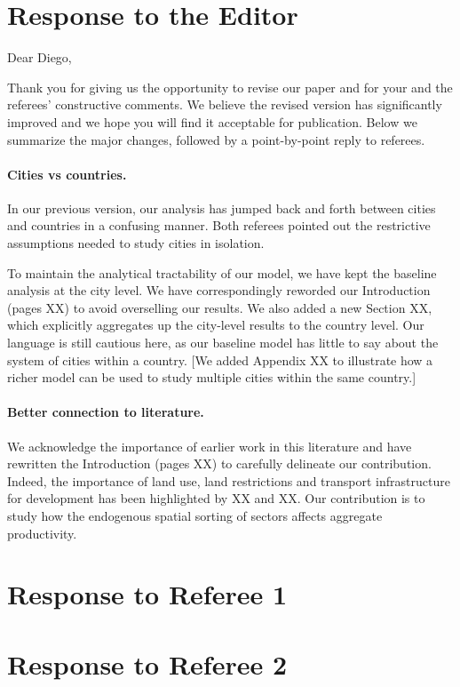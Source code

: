 \newpage
\section*{Response to the Editor}
Dear Diego,

Thank you for giving us the opportunity to revise our paper and for your and the referees' constructive comments. We believe the revised version has significantly improved and we hope you will find it acceptable for publication. Below we summarize the major changes, followed by a point-by-point reply to referees.

\paragraph{Cities vs countries.} In our previous version, our analysis has jumped back and forth between cities and countries in a confusing manner. Both referees pointed out the restrictive assumptions needed to study cities in isolation. 

To maintain the analytical tractability of our model, we have kept the baseline analysis at the city level. We have correspondingly reworded our Introduction (pages XX) to avoid overselling our results. We also added a new Section XX, which explicitly aggregates up the city-level results to the country level. Our language is still cautious here, as our baseline model has little to say about the system of cities within a country. [We added Appendix XX to illustrate how a richer model can be used to study multiple cities within the same country.]

\paragraph{Better connection to literature.} We acknowledge the importance of earlier work in this literature and have rewritten the Introduction (pages XX) to carefully delineate our contribution. Indeed, the importance of land use, land restrictions and transport infrastructure for development has been highlighted by XX and XX. Our contribution is to study how the endogenous spatial sorting of sectors affects aggregate productivity.

\newpage
\section*{Response to Referee 1}

\newpage
\section*{Response to Referee 2}

